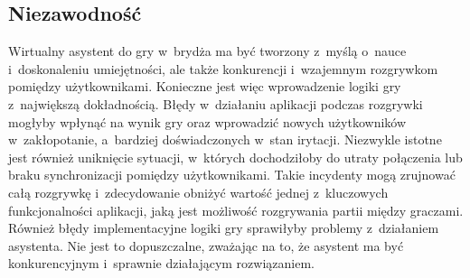 \subsection{Niezawodność}
Wirtualny asystent do gry w~brydża ma być tworzony z~myślą o~nauce
i~doskonaleniu umiejętności, ale także konkurencji i~wzajemnym
rozgrywkom pomiędzy użytkownikami. Konieczne jest więc wprowadzenie logiki
gry z~największą dokładnością. Błędy w~działaniu aplikacji podczas
rozgrywki mogłyby wpłynąć na wynik gry oraz wprowadzić nowych użytkowników
w~zakłopotanie, a~bardziej doświadczonych w~stan irytacji.
Niezwykle istotne jest również uniknięcie sytuacji, w~których
dochodziłoby do utraty połączenia lub braku synchronizacji pomiędzy
użytkownikami. Takie incydenty mogą zrujnować całą rozgrywkę i~zdecydowanie
obniżyć wartość jednej z~kluczowych funkcjonalności aplikacji, jaką
jest możliwość rozgrywania partii między graczami.
Również błędy implementacyjne logiki gry sprawiłyby problemy
z~działaniem asystenta. Nie jest to dopuszczalne, zważając na to,
że asystent ma być konkurencyjnym i~sprawnie działającym rozwiązaniem.

